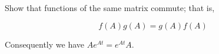\item[3.23] Show that functions of the same matrix commute; that is,

\begin{equation*}
 f(A) g(A) = g(A)f(A)
\end{equation*}

Consequently we have $A e^{At} = e^{At} A$.
